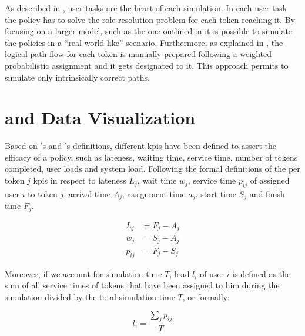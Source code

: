 

As described in , user tasks are the heart of each simulation. In each user task the policy has to solve the role resolution problem for each token reaching it. By focusing on a larger model, such as the one outlined in  it is possible to simulate the policies in a ``real-world-like'' scenario. Furthermore, as explained in , the logical path flow for each token is manually prepared following a weighted probabilistic assignment and it gets designated to it. This approach permits to simulate only intrinsically correct paths. 

\section{ and Data Visualization}

Based on \citet{Pinedo2008}'s and \citet{Zeng2005}'s definitions, different \glspl{kpi} have been defined to assert the efficacy of a policy, such as lateness, waiting time, service time, number of tokens completed, user loads and system load. Following the formal definitions of the per token $j$ \glspl{kpi} in respect to lateness $L_j$, wait time $w_j$, service time $p_{ij}$ of assigned user $i$ to token $j$, arrival time $A_j$, assignment time $a_j$, start time $S_j$ and finish time $F_j$.

\begin{align}
	L_j&=F_j-A_j \label{eq:lateness}\\
	w_j&=S_j-A_j \\
	p_{ij}&=F_j-S_j
\end{align}

Moreover, if we account for simulation time $T$, load $l_i$ of user $i$ is defined as the sum of all service times of tokens that have been assigned to him during the simulation divided by the total simulation time $T$, or formally:

\begin{equation}
	l_i=\frac{\sum_j p_{ij}}{T}
\end{equation}

